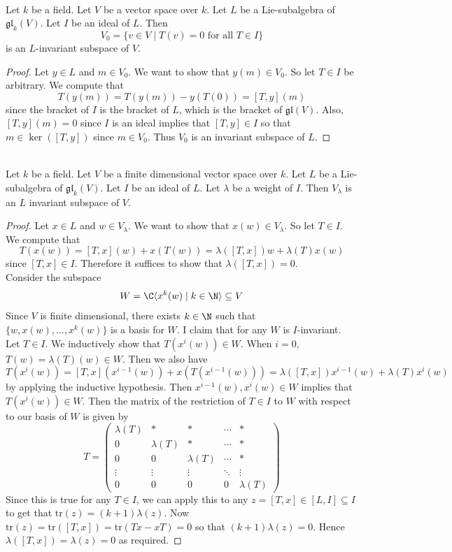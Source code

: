 \documentclass[a4paper]{article}
\begin{document}
\begin{prp}{}{} \\Let $k$ be a field. Let $V$ be a vector space over $k$. Let $L$ be a Lie-subalgebra of $\mathfrak{gl}_k(V)$. Let $I$ be an ideal of $L$. Then $$V_0=\{v\in V\;|\;T(v)=0\text{ for all }T\in I\}$$ is an $L$-invariant subspace of $V$. 
\begin{proof}
Let $y\in L$ and $m\in V_0$. We want to show that $y(m)\in V_0$. So let $T\in I$ be arbitrary. We compute that $$T(y(m))=T(y(m))-y(T(0))=[T,y](m)$$ since the bracket of $I$ is the bracket of $L$, which is the bracket of $\mathfrak{gl}(V)$. Also, $[T,y](m)=0$ since $I$ is an ideal implies that $[T,y]\in I$ so that $m\in\ker([T,y])$ since $m\in V_0$. Thus $V_0$ is an invariant subspace of $L$. 
\end{proof}
\end{prp}

\begin{prp}{}{} \\Let $k$ be a field. Let $V$ be a finite dimensional vector space over $k$. Let $L$ be a Lie-subalgebra of $\mathfrak{gl}_k(V)$. Let $I$ be an ideal of $L$. Let $\lambda$ be a weight of $I$. Then $V_\lambda$ is an $L$ invariant subspace of $V$. 
\begin{proof}
Let $x\in L$ and $w\in V_\lambda$. We want to show that $x(w)\in V_\lambda$. So let $T\in I$. We compute that $$T(x(w))=[T,x](w)+x(T(w))=\lambda([T,x])w+\lambda(T)x(w)$$ since $[T,x]\in I$. Therefore it suffices to show that $\lambda([T,x])=0$. \\

Consider the subspace $$W=\C\langle x^k(w)\;|\;k\in\N\rangle\subseteq V$$ Since $V$ is finite dimensional, there exists $k\in\N$ such that $\{w,x(w),\dots,x^k(w)\}$ is a basis for $W$. I claim that for any $W$ is $I$-invariant. Let $T\in I$. We inductively show that $T(x^i(w))\in W$. When $i=0$, $T(w)=\lambda(T)(w)\in W$. Then we also have $$T(x^i(w))=[T,x](x^{i-1}(w))+x(T(x^{i-1}(w)))=\lambda([T,x])x^{i-1}(w)+\lambda(T)x^i(w)$$ by applying the inductive hypothesis. Then $x^{i-1}(w),x^i(w)\in W$ implies that $T(x^i(w))\in W$. Then the matrix of the restriction of $T\in I$ to $W$ with respect to our basis of $W$ is given by $$T=\begin{pmatrix}
\lambda(T) & \ast & \ast & \cdots & \ast\\
0 & \lambda(T) & \ast & \cdots & \ast\\
0 & 0 & \lambda(T) & \cdots & \ast\\
\vdots & \vdots & \vdots & \ddots & \vdots\\
0 & 0 & 0 & 0 & \lambda(T)
\end{pmatrix}$$
Since this is true for any $T\in I$, we can apply this to any $z=[T,x]\in [L,I]\subseteq I$ to get that $\text{tr}(z)=(k+1)\lambda(z)$. Now $\text{tr}(z)=\text{tr}([T,x])=\text{tr}(Tx-xT)=0$ so that $(k+1)\lambda(z)=0$. Hence $\lambda([T,x])=\lambda(z)=0$ as required. 
\end{proof}
\end{prp}
\end{document}
